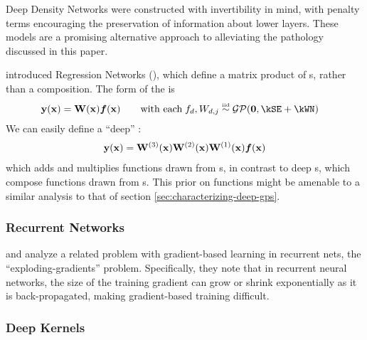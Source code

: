 Deep Density Networks \citep{rippel2013high} were constructed with invertibility in mind, with penalty terms encouraging the preservation of information about lower layers.
These models are a promising alternative approach to alleviating the pathology discussed in this paper.

\citet{wilson2012gaussian} introduced \gp{} Regression Networks (\gprn{}), which define a matrix product of \gp{}s, rather than a composition.
The form of the \gprn{} is
%
\begin{align}
\vy(\vx) & = \vW(\vx) \vf(\vx) \qquad \textnormal{with each} \; f_{d}, W_{d,j} \simiid \GPt{\vzero}{\kSE + \kWN}
\end{align}
%
We can easily define a ``deep'' \gprn{}:
%
\begin{align}
{\bf{y}}({\bf{x}}) = \mathbf{W}^{(3)}({\bf{x}}) \mathbf{W}^{(2)}({\bf{x}}) \mathbf{W}^{(1)}({\bf{x}}) \boldsymbol{f}({\bf{x}})
\end{align}
%
which adds and multiplies functions drawn from \gp{}s, in contrast to deep \gp{}s, which compose functions drawn from \gp{}s.
This prior on functions might be amenable to a similar analysis to that of section \ref{sec:characterizing-deep-gps}.

%
%
%




\subsubsection{Recurrent Networks}
\cite{bengio1994learning} and \cite{pascanu2012understanding} analyze a related problem with gradient-based learning in recurrent nets, the ``exploding-gradients'' problem.
Specifically, they note that in recurrent neural networks, the size of the training gradient can grow or shrink exponentially as it is back-propagated, making gradient-based training difficult.

\subsubsection{Deep Kernels}

